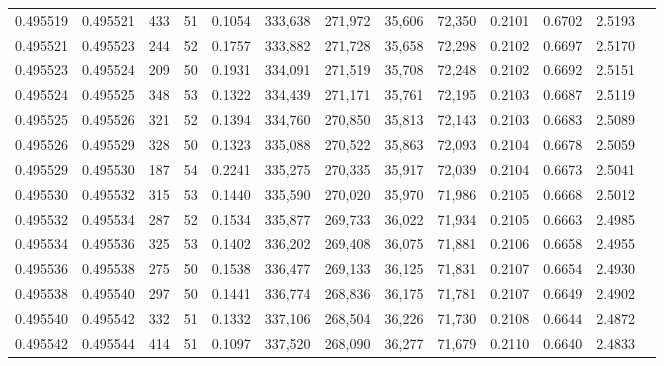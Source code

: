 \begin{tabular}{rrrrrrrrrrrrr}
0.495519 & 0.495521 &   433 &  51 &                                     0.1054 & 333,638 & 271,972 &  35,606 &  72,350 & 0.2101 & 0.6702 & 2.5193 \\
0.495521 & 0.495523 &   244 &  52 &                                     0.1757 & 333,882 & 271,728 &  35,658 &  72,298 & 0.2102 & 0.6697 & 2.5170 \\
0.495523 & 0.495524 &   209 &  50 &                                     0.1931 & 334,091 & 271,519 &  35,708 &  72,248 & 0.2102 & 0.6692 & 2.5151 \\
0.495524 & 0.495525 &   348 &  53 &                                     0.1322 & 334,439 & 271,171 &  35,761 &  72,195 & 0.2103 & 0.6687 & 2.5119 \\
0.495525 & 0.495526 &   321 &  52 &                                     0.1394 & 334,760 & 270,850 &  35,813 &  72,143 & 0.2103 & 0.6683 & 2.5089 \\
0.495526 & 0.495529 &   328 &  50 &                                     0.1323 & 335,088 & 270,522 &  35,863 &  72,093 & 0.2104 & 0.6678 & 2.5059 \\
0.495529 & 0.495530 &   187 &  54 &                                     0.2241 & 335,275 & 270,335 &  35,917 &  72,039 & 0.2104 & 0.6673 & 2.5041 \\
0.495530 & 0.495532 &   315 &  53 &                                     0.1440 & 335,590 & 270,020 &  35,970 &  71,986 & 0.2105 & 0.6668 & 2.5012 \\
0.495532 & 0.495534 &   287 &  52 &                                     0.1534 & 335,877 & 269,733 &  36,022 &  71,934 & 0.2105 & 0.6663 & 2.4985 \\
0.495534 & 0.495536 &   325 &  53 &                                     0.1402 & 336,202 & 269,408 &  36,075 &  71,881 & 0.2106 & 0.6658 & 2.4955 \\
0.495536 & 0.495538 &   275 &  50 &                                     0.1538 & 336,477 & 269,133 &  36,125 &  71,831 & 0.2107 & 0.6654 & 2.4930 \\
0.495538 & 0.495540 &   297 &  50 &                                     0.1441 & 336,774 & 268,836 &  36,175 &  71,781 & 0.2107 & 0.6649 & 2.4902 \\
0.495540 & 0.495542 &   332 &  51 &                                     0.1332 & 337,106 & 268,504 &  36,226 &  71,730 & 0.2108 & 0.6644 & 2.4872 \\
0.495542 & 0.495544 &   414 &  51 &                                     0.1097 & 337,520 & 268,090 &  36,277 &  71,679 & 0.2110 & 0.6640 & 2.4833 \\

\end{tabular}
